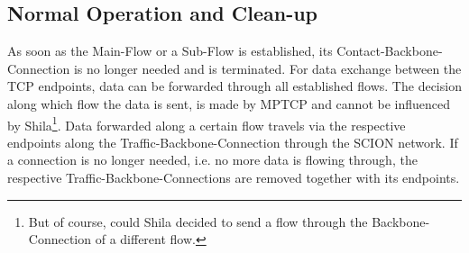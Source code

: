 \subsection*{Normal Operation and Clean-up}
\label{subsec:ShilaCleanUp}

As soon as the Main-Flow or a Sub-Flow is established, its Contact-Backbone-Connection is no longer needed and is terminated. For data exchange between the TCP endpoints, data can be forwarded through all established flows. The decision along which flow the data is sent, is made by MPTCP and cannot be influenced by Shila\footnote{But of course, could Shila decided to send a flow through the Backbone-Connection of a different flow.}. Data forwarded along a certain flow travels via the respective endpoints along the Traffic-Backbone-Connection through the SCION network.  If a connection is no longer needed, i.e. no more data is flowing through, the respective Traffic-Backbone-Connections are removed together with its endpoints.
